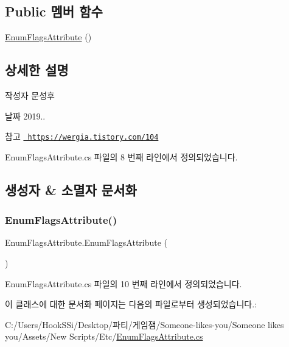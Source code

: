 \subsection*{Public 멤버 함수}
\begin{DoxyCompactItemize}
\item 
\mbox{\hyperlink{class_enum_flags_attribute_a5b29527c68c91ff6fc3dd9e26c2253b8}{Enum\+Flags\+Attribute}} ()
\end{DoxyCompactItemize}


\subsection{상세한 설명}
\begin{DoxyAuthor}{작성자}
문성후 
\end{DoxyAuthor}
\begin{DoxyDate}{날짜}
2019.. 
\end{DoxyDate}
\begin{DoxySeeAlso}{참고}
\href{https://wergia.tistory.com/104}{\texttt{ https\+://wergia.\+tistory.\+com/104}} 
\end{DoxySeeAlso}


Enum\+Flags\+Attribute.\+cs 파일의 8 번째 라인에서 정의되었습니다.



\subsection{생성자 \& 소멸자 문서화}
\mbox{\label{class_enum_flags_attribute_a5b29527c68c91ff6fc3dd9e26c2253b8}} 
\subsubsection{\texorpdfstring{EnumFlagsAttribute()}{EnumFlagsAttribute()}}
{\footnotesize\ttfamily Enum\+Flags\+Attribute.\+Enum\+Flags\+Attribute (\begin{DoxyParamCaption}{ }\end{DoxyParamCaption})}



Enum\+Flags\+Attribute.\+cs 파일의 10 번째 라인에서 정의되었습니다.


\begin{DoxyCode}{0}

\end{DoxyCode}


이 클래스에 대한 문서화 페이지는 다음의 파일로부터 생성되었습니다.\+:\begin{DoxyCompactItemize}
\item 
C\+:/\+Users/\+Hook\+S\+Si/\+Desktop/파티/게임잼/\+Someone-\/likes-\/you/\+Someone likes you/\+Assets/\+New Scripts/\+Etc/\mbox{\hyperlink{_enum_flags_attribute_8cs}{Enum\+Flags\+Attribute.\+cs}}\end{DoxyCompactItemize}
